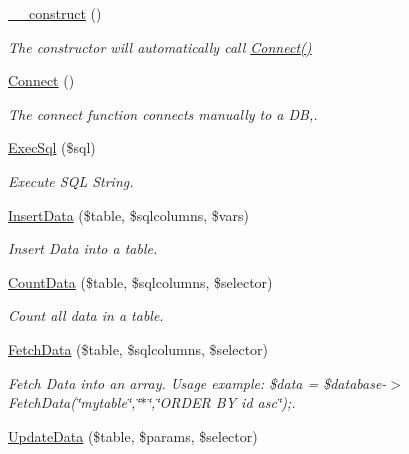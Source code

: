 \begin{DoxyCompactItemize}
\item 
\hyperlink{class_u_e4_a_m___d_b_handler_a095c5d389db211932136b53f25f39685}{\-\_\-\-\_\-construct} ()
\begin{DoxyCompactList}\small\item\em The constructor will automatically call \hyperlink{class_u_e4_a_m___d_b_handler_a9ac768272a054d6ef7e8436f1144b730}{Connect()} \end{DoxyCompactList}\item 
\hyperlink{class_u_e4_a_m___d_b_handler_a9ac768272a054d6ef7e8436f1144b730}{Connect} ()
\begin{DoxyCompactList}\small\item\em The connect function connects manually to a D\-B,. \end{DoxyCompactList}\item 
\hyperlink{class_u_e4_a_m___d_b_handler_aabe8429ec9577391e2ea244fe805c5ec}{Exec\-Sql} (\$sql)
\begin{DoxyCompactList}\small\item\em Execute S\-Q\-L String. \end{DoxyCompactList}\item 
\hyperlink{class_u_e4_a_m___d_b_handler_ab8ad12e8a3f2fed48c7e6974e58f6dcd}{Insert\-Data} (\$table, \$sqlcolumns, \$vars)
\begin{DoxyCompactList}\small\item\em Insert Data into a table. \end{DoxyCompactList}\item 
\hyperlink{class_u_e4_a_m___d_b_handler_a4c52087a53b72ebcc4b07961dadb908d}{Count\-Data} (\$table, \$sqlcolumns, \$selector)
\begin{DoxyCompactList}\small\item\em Count all data in a table. \end{DoxyCompactList}\item 
\hyperlink{class_u_e4_a_m___d_b_handler_a3858bee81ad39a80260c2fc0989ba358}{Fetch\-Data} (\$table, \$sqlcolumns, \$selector)
\begin{DoxyCompactList}\small\item\em Fetch Data into an array. Usage example\-: \$data = \$database-\/$>$Fetch\-Data(\char`\"{}mytable\char`\"{},\char`\"{}$\ast$\char`\"{},\char`\"{}\-O\-R\-D\-E\-R B\-Y id asc\char`\"{});. \end{DoxyCompactList}\item 
\hyperlink{class_u_e4_a_m___d_b_handler_a2b7783f4412697ee22ee576658082ff0}{Update\-Data} (\$table, \$params, \$selector)

\end{DoxyCompactItemize}
